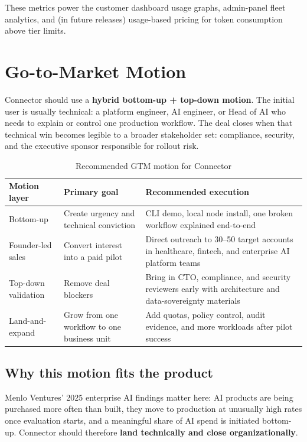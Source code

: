 These metrics power the customer dashboard usage graphs, admin-panel
fleet analytics, and (in future releases) usage-based pricing for token
consumption above tier limits.

\section{Go-to-Market Motion}

Connector should use a \textbf{hybrid bottom-up + top-down motion}. The initial
user is usually technical: a platform engineer, AI engineer, or Head of AI who
needs to explain or control one production workflow. The deal closes when that
technical win becomes legible to a broader stakeholder set: compliance,
security, and the executive sponsor responsible for rollout risk.

\begin{table}[H]
\centering
\renewcommand{\arraystretch}{1.45}
\begin{tabularx}{\textwidth}{@{}lXX@{}}
\toprule
\textbf{Motion layer} & \textbf{Primary goal} & \textbf{Recommended execution} \\
\midrule
Bottom-up & Create urgency and technical conviction & CLI demo, local node install, one broken workflow explained end-to-end \\
Founder-led sales & Convert interest into a paid pilot & Direct outreach to 30--50 target accounts in healthcare, fintech, and enterprise AI platform teams \\
Top-down validation & Remove deal blockers & Bring in CTO, compliance, and security reviewers early with architecture and data-sovereignty materials \\
Land-and-expand & Grow from one workflow to one business unit & Add quotas, policy control, audit evidence, and more workloads after pilot success \\
\bottomrule
\end{tabularx}
\caption{Recommended GTM motion for Connector}
\end{table}

\subsection{Why this motion fits the product}

Menlo Ventures' 2025 enterprise AI findings matter here: AI products are being
purchased more often than built, they move to production at unusually high
rates once evaluation starts, and a meaningful share of AI spend is initiated
bottom-up. Connector should therefore \textbf{land technically and close
organizationally}.

